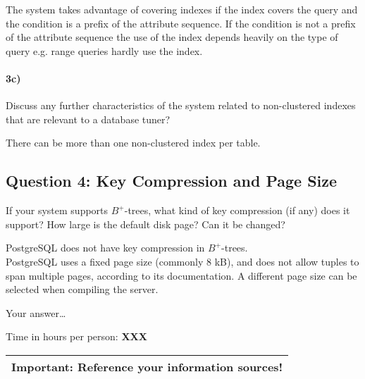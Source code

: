 \documentclass[11pt]{scrartcl}
\begin{document}
The system takes advantage of covering indexes if the index covers the query and the condition is a prefix of the attribute sequence. If the condition is not a prefix of the attribute sequence the use of the index depends heavily on the type of query e.g. range queries hardly use the index.

\paragraph{3c)} Discuss any further characteristics of the system related to
non-clustered indexes that are relevant to a database tuner?

There can be more than one non-clustered index per table.

\subsection*{Question 4: Key Compression and Page Size} If your system
supports $B^+$-trees, what kind of key compression (if any) does it
support?  How large is the default disk page? Can it be changed?

PostgreSQL does not have key compression in $B^+$-trees.\\
PostgreSQL uses a fixed page size (commonly 8 kB), and does not allow tuples to span multiple pages, according to its documentation.
A different page size can be selected when compiling the server.
\smallskip

Your answer\dots


\bigskip

\noindent Time in hours per person: {\bf XXX}

\bigskip

\begin{center}
  \begin{tabular}{c}
    \hline
    {\bf Important:} Reference your information sources!
    \\\hline
  \end{tabular}
\end{center}
\end{document}
